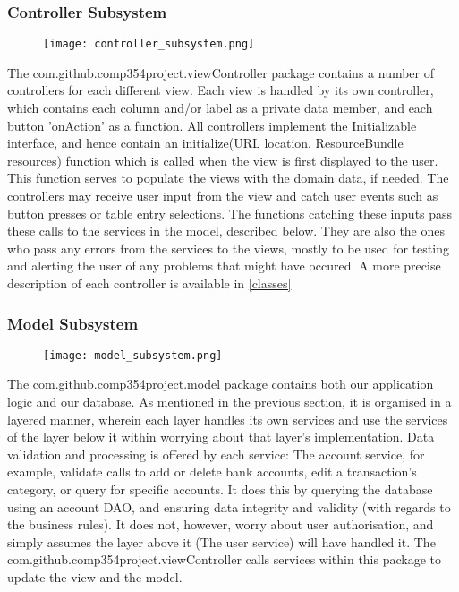 \documentclass[12pt]{article}
\begin{document}
\subsubsection*{Controller Subsystem}

\begin{figure}[H]
\texttt{[image: controller\_subsystem.png]}
\end{figure}
The com.github.comp354project.viewController package contains a number of controllers for each different view. Each view is handled by its own controller, which contains each column and/or label as a private data member, and each button 'onAction' as a function. All controllers implement the Initializable interface, and hence contain an initialize(URL location, ResourceBundle resources) function which is called when the view is first displayed to the user. This function serves to populate the views with the domain data, if needed.  The controllers may receive user input from the view and catch user events such as button presses or table entry selections. The functions catching these inputs pass these calls to the services in the model, described below.   They are also the ones who pass any errors from the services to the views, mostly to be used for testing and alerting the user of any problems that might have occured.
 A more precise description of each controller is available in \ref{classes}
 
 \subsubsection*{Model Subsystem}
\begin{figure}[H]
\texttt{[image: model\_subsystem.png]}
\end{figure}
The com.github.comp354project.model package contains both our application logic and our database.  As mentioned in the previous section, it is organised in a layered manner, wherein each layer handles its own services and use the services of the layer below it within worrying about that layer's implementation. Data validation and processing is offered by each service: The account service, for example, validate calls to add or delete bank accounts, edit a transaction's category, or query for specific accounts. It does this by querying the database using an account DAO, and ensuring data integrity and validity (with regards to the business rules). It does not, however, worry about user authorisation, and simply assumes the layer above it (The user service) will have handled it. The com.github.comp354project.viewController calls services within this package to update the view and the model.
\end{document}
